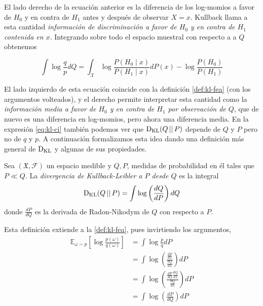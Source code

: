 \documentclass[main.tex]{subfiles}
\begin{document}
El lado derecho de la ecuación anterior es la diferencia de los log-momios a favor de $H_0$ y en contra de $H_1$ antes y después de observar $X=x$. Kullback llama a esta cantidad \textit{información de discriminación a favor de $H_0$ y en contra de $H_1$ contenida en $x$}. Integrando sobre todo el espacio muestral con respecto a a $Q$ obtenemos 

\begin{equation}\label{eq:kl-ci}
\int\log\frac{q}{p}dQ = \int_\mathcal{X}\log\frac{P(H_0\mid x)}{P(H_1\mid x)}dP(x)-\log\frac{P(H_0)}{P(H_1)}
\end{equation}

El lado izquierdo de esta ecuación coincide con la definición \ref{def:kl-fea} (con los argumentos volteados), y el derecho permite interpretar esta cantidad como la \textit{información media a favor de $H_0$ y en contra de $H_1$ por observación de $Q$}, que de nuevo es una diferencia en log-momios, pero ahora una diferencia media. En la expresión \eqref{eq:kl-ci} también podemos ver que $\operatorname*{D_{KL}}(Q\operatorname*{\mid\mid} P)$ depende de $Q$ y $P$ pero no de $q$ y $p$. A continuación formalizamos esta idea dando una definición más general de $\operatorname*{D_{KL}}$ y algunas de sus propiedades.

\begin{definition}\label{def:kl}
Sea $(\mathfrak{X}, \mathcal{F})$ un espacio medible y $Q, P$, medidas de probabilidad en él tales que $P \ll Q$. La \textit{divergencia de Kullback-Leibler a $P$ desde $Q$} es la integral
\begin{equation}\label{eqn:kl}
	\operatorname*{D_{KL}}(Q\operatorname*{\mid\mid} P)=\int\log\left(\frac{dQ}{dP}\right)dQ
\end{equation}
donde $\frac{dP}{dQ}$ es la derivada de Radon-Nikodym de $Q$ con respecto a $P$.
\end{definition}

Esta definición extiende a la \ref{def:kl-fea}, pues invirtiendo los argumentos,
\begin{align*}
\mathbb{E}_{\omega\sim p}\left[\log\frac{p(\omega)}{q(\omega)}\right] &= \int\log\frac{p}{q}dP \\
&= \int\log\left(\frac{\frac{dP}{d\lambda}}{\frac{dQ}{d\lambda}}\right)dP \\
&= \int\log\left(\frac{\frac{dP}{dQ}\frac{dQ}{d\lambda}}{\frac{dQ}{d\lambda}}\right)dP \\
&= \int\log\left(\frac{dP}{dQ}\right)dP
\end{align*}
\end{document}
